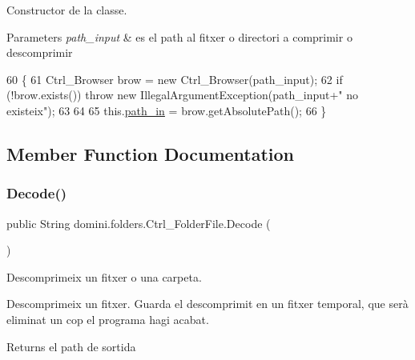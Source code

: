 Constructor de la classe. 


\begin{DoxyParams}{Parameters}
{\em path\+\_\+input} & es el path al fitxer o directori a comprimir o descomprimir \\
\hline
\end{DoxyParams}

\begin{DoxyCode}
60                                               \{
61         Ctrl\_Browser brow = \textcolor{keyword}{new} Ctrl\_Browser(path\_input);
62         \textcolor{keywordflow}{if} (!brow.exists()) \textcolor{keywordflow}{throw} \textcolor{keyword}{new} IllegalArgumentException(path\_input+\textcolor{stringliteral}{" no existeix"});
63 
64 
65         this.\hyperlink{classdomini_1_1folders_1_1Ctrl__FolderFile_a0d3946bb2832a1f34d0c2227df5c71c4}{path\_in} = brow.getAbsolutePath();
66     \}
\end{DoxyCode}


\subsection{Member Function Documentation}
\mbox{\label{classdomini_1_1folders_1_1Ctrl__FolderFile_a5d28ac7f5223ecd40a242148e86447c1}} 
\subsubsection{\texorpdfstring{Decode()}{Decode()}\hspace{0.1cm}{\footnotesize\ttfamily [1/2]}}
{\footnotesize\ttfamily public String domini.\+folders.\+Ctrl\+\_\+\+Folder\+File.\+Decode (\begin{DoxyParamCaption}{ }\end{DoxyParamCaption})\hspace{0.3cm}{\ttfamily [inline]}}



Descomprimeix un fitxer o una carpeta. 

Descomprimeix un fitxer. Guarda el descomprimit en un fitxer temporal, que serà eliminat un cop el programa hagi acabat.

\begin{DoxyReturn}{Returns}
el path de sortida 
\end{DoxyReturn}

